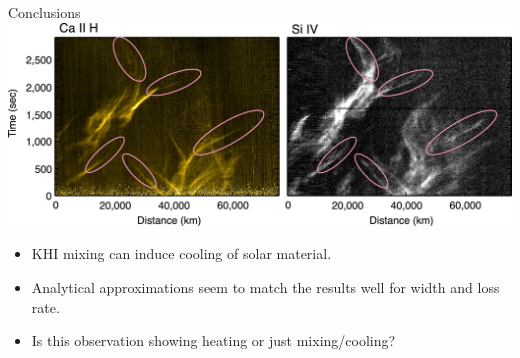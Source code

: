 \documentclass[10pt,aspectratio=169,usenames,dvipsnames]{beamer}
\begin{document}
\begin{frame}{Conclusions}
\includegraphics[width=0.95\linewidth]{2023Dundee/Figures/observation.png}
\begin{itemize}
    \item KHI mixing can induce cooling of solar material.
    \item Analytical approximations seem to match the results well for width and loss rate.
    \item Is this observation showing heating or just mixing/cooling?
\end{itemize}
\end{frame}


\end{document}

